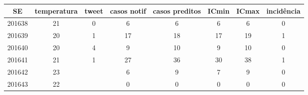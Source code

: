 \begin{tabular}{c|ccccccc}
  \hline
SE & temperatura & tweet & casos notif & casos preditos & ICmin & ICmax & incidência \\ 
  \hline
201638 & 21 & 0 & 6 & 6 & 6 & 6 & 0 \\ 
  201639 & 20 & 1 & 17 & 18 & 17 & 19 & 1 \\ 
  201640 & 20 & 4 & 9 & 10 & 9 & 10 & 0 \\ 
  201641 & 21 & 1 & 27 & 36 & 30 & 38 & 1 \\ 
  201642 & 23 &  & 6 & 9 & 7 & 9 & 0 \\ 
  201643 & 22 &  & 0 & 0 & 0 & 0 & 0 \\ 
   \hline
\end{tabular}

